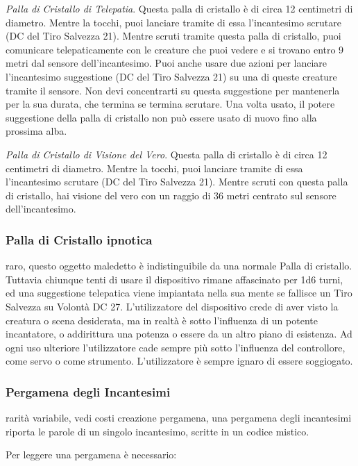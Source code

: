 \begin{multicols}{2}
\textit{Palla di Cristallo di Telepatia}. Questa palla di cristallo è di circa 12 centimetri di diametro. Mentre la tocchi, puoi lanciare tramite di essa l'incantesimo scrutare (DC del Tiro Salvezza 21). Mentre scruti tramite questa palla di cristallo, puoi comunicare telepaticamente con le creature che puoi vedere e si trovano entro 9 metri dal sensore dell'incantesimo. Puoi anche usare due azioni per lanciare l'incantesimo suggestione (DC del Tiro Salvezza 21) su una di queste creature tramite il sensore. Non devi concentrarti su questa suggestione per mantenerla per la sua durata, che termina se termina scrutare. Una volta usato, il potere suggestione della palla di cristallo non può essere usato di nuovo fino alla prossima alba.

\textit{Palla di Cristallo di Visione del Vero}. Questa palla di cristallo è di circa 12 centimetri di diametro. Mentre la tocchi, puoi lanciare tramite di essa l'incantesimo scrutare (DC del Tiro Salvezza 21). Mentre scruti con questa palla di cristallo, hai visione del vero con un raggio di 36 metri centrato sul sensore dell'incantesimo.

\subsubsection*{Palla di Cristallo ipnotica}
raro, questo oggetto maledetto è indistinguibile da una normale Palla di cristallo. Tuttavia chiunque tenti di usare il dispositivo rimane affascinato per 1d6 turni, ed una suggestione telepatica viene impiantata nella sua mente se fallisce un Tiro Salvezza su Volontà DC 27. L'utilizzatore del dispositivo crede di aver visto la creatura o scena desiderata, ma in realtà è sotto l'influenza di un potente incantatore, o addirittura una potenza o essere da un altro piano di esistenza. Ad ogni uso ulteriore l'utilizzatore cade sempre più sotto l’influenza del controllore, come servo o come strumento. L'utilizzatore è sempre ignaro di essere soggiogato.

\subsubsection*{Pergamena degli Incantesimi}
rarità variabile, vedi costi creazione pergamena, una pergamena degli incantesimi riporta le parole di un singolo incantesimo, scritte in un codice mistico.

Per leggere una pergamena è necessario:


\end{multicols}
